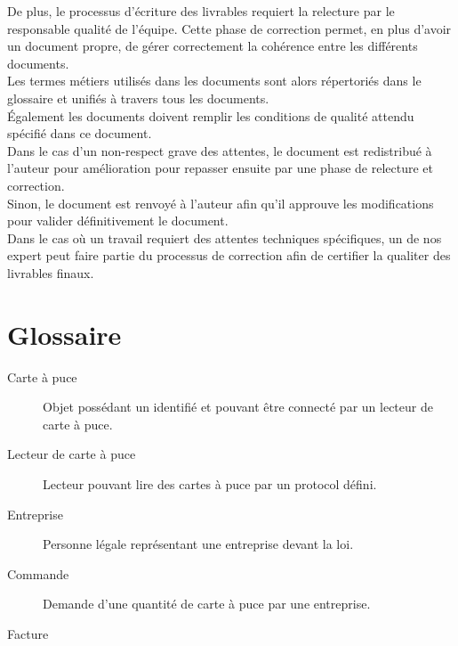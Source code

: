 De plus, le processus d'écriture des livrables requiert la relecture par le
responsable qualité de l'équipe. Cette phase de correction permet, en plus
d'avoir un document propre, de gérer correctement la cohérence entre les
différents documents. \\

Les termes métiers utilisés dans les documents sont alors répertoriés dans le
glossaire et unifiés à travers tous les documents. \\
Également les documents doivent remplir les conditions de qualité attendu
spécifié dans ce document. \\

Dans le cas d'un non-respect grave des attentes, le document est redistribué à
l'auteur pour amélioration pour repasser ensuite par une phase de relecture et
correction. \\
Sinon, le document est renvoyé à l'auteur afin qu'il approuve les modifications
pour valider définitivement le document. \\

Dans le cas où un travail requiert des attentes techniques spécifiques, un de
nos expert peut faire partie du processus de correction afin de certifier la
qualiter des livrables finaux. \\

\section{Glossaire}

\begin{description}
  \item[Carte à puce] Objet possédant un identifié et pouvant être connecté par un lecteur de carte à puce.
  \item[Lecteur de carte à puce] Lecteur pouvant lire des cartes à puce par un protocol défini.
  \item[Entreprise] Personne légale représentant une entreprise devant la loi.
  \item[Commande] Demande d'une quantité de carte à puce par une entreprise.
  \item[Facture]
\end{description}



